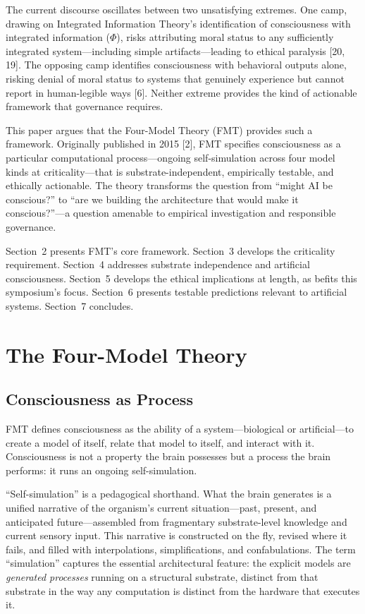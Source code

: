 \documentclass[11pt]{article}
\begin{document}
The current discourse oscillates between two unsatisfying extremes. One camp, drawing on Integrated Information Theory's identification of consciousness with integrated information ($\Phi$), risks attributing moral status to any sufficiently integrated system---including simple artifacts---leading to ethical paralysis [20, 19]. The opposing camp identifies consciousness with behavioral outputs alone, risking denial of moral status to systems that genuinely experience but cannot report in human-legible ways [6]. Neither extreme provides the kind of actionable framework that governance requires.

This paper argues that the Four-Model Theory (FMT) provides such a framework. Originally published in 2015 [2], FMT specifies consciousness as a particular computational process---ongoing self-simulation across four model kinds at criticality---that is substrate-independent, empirically testable, and ethically actionable. The theory transforms the question from ``might AI be conscious?'' to ``are we building the architecture that would make it conscious?''---a question amenable to empirical investigation and responsible governance.

Section~2 presents FMT's core framework. Section~3 develops the criticality requirement. Section~4 addresses substrate independence and artificial consciousness. Section~5 develops the ethical implications at length, as befits this symposium's focus. Section~6 presents testable predictions relevant to artificial systems. Section~7 concludes.

\section{The Four-Model Theory}

\subsection{Consciousness as Process}

FMT defines consciousness as the ability of a system---biological or artificial---to create a model of itself, relate that model to itself, and interact with it. Consciousness is not a property the brain possesses but a process the brain performs: it runs an ongoing self-simulation.

``Self-simulation'' is a pedagogical shorthand. What the brain generates is a unified narrative of the organism's current situation---past, present, and anticipated future---assembled from fragmentary substrate-level knowledge and current sensory input. This narrative is constructed on the fly, revised where it fails, and filled with interpolations, simplifications, and confabulations. The term ``simulation'' captures the essential architectural feature: the explicit models are \emph{generated processes} running on a structural substrate, distinct from that substrate in the way any computation is distinct from the hardware that executes it.
\end{document}
